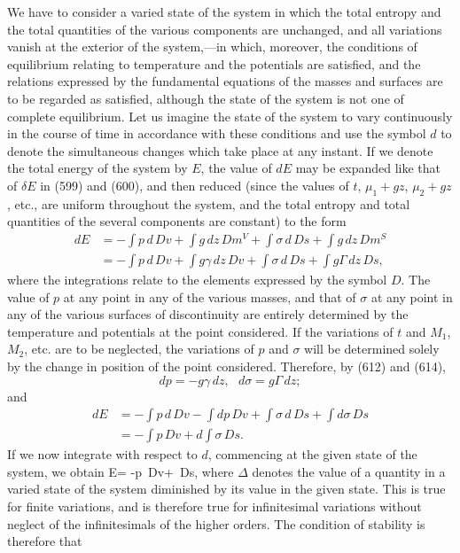 \documentclass[12pt]{memoir}
\newcommand{\dd}{\delta}
\begin{document}
We have to consider a varied state of the system in which the total entropy and the total quantities of the various components are unchanged, and all variations vanish at the exterior of the system,---in which, moreover, the conditions of equilibrium relating to temperature and the potentials are satisfied, and the relations expressed by the fundamental equations of the masses and surfaces are to be regarded as satisfied, although the state of the system is not one of complete equilibrium. Let us imagine the state of the system to vary continuously in the course of time in accordance with these conditions and use the symbol $d$ to denote the simultaneous changes which take place at any instant. If we denote the total energy of the system by $E$, the value of $dE$ may be expanded like that of $\dd E$ in (599) and (600), and then reduced (since the values of $t$, $\mu_1+gz$, $\mu_2+gz$, etc., are uniform throughout the system, and the total entropy and total quantities of the several components are constant) to the form
\begin{align} dE &= -\int p \, d\, Dv +\int g \, dz \, Dm^V +\int \sigma \,d\,Ds +\int g \, dz\, Dm^S \nonumber \\
 &= -\int p \, d\, Dv +\int g \gamma\, dz \, Dv +\int \sigma \,d\,Ds +\int g \Gamma \, dz\, Ds,  \label{621} \end{align}
where the integrations relate to the elements expressed by the symbol $D$. The value of $p$ at any point in any of the various masses, and that of $\sigma$ at any point in any of the various surfaces of discontinuity are entirely determined by the temperature and potentials at the point considered. If the variations of $t$ and $M_1$, $M_2$, etc. are to be neglected, the variations of $p$ and $\sigma$ will be determined solely by the change in position of the point considered. Therefore, by (612) and (614),
$$dp=-g\gamma \, dz, \ \ \ d\sigma =g\Gamma \, dz;$$
and
\begin{align} dE&= -\int p \,d\, Dv -\int dp \, Dv +\int \sigma \, d\, Ds +\int d\sigma \, Ds\nonumber \\
 &=    -\int p \, Dv+d\int \sigma\, Ds.   \label{622} \end{align}
If we now integrate with respect to $d$, commencing at the given state of the system, we obtain
\eqs \Delta E= -\Delta \int p \,Dv+ \Delta \int \sigma  \,Ds,   \label{623} \eqe
where $\Delta$ denotes the value of a quantity in a varied state of the system diminished by its value in the given state. This is true for finite variations, and is therefore true for infinitesimal variations without neglect of the infinitesimals of the higher orders. The condition of stability is therefore that
\end{document}
